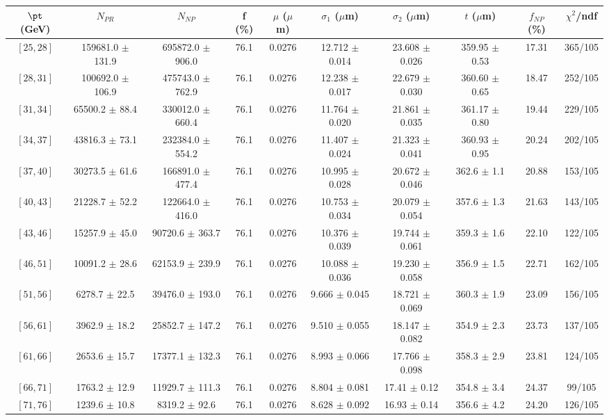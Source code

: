 \begin{tabular}{c||c|c|c|c|c|c|c||c|c}
$\pt$ (GeV) & $N_{PR}$ & $N_{NP}$ & f (\%) & $\mu$ ($\mu$m) & $\sigma_1$ ($\mu$m) & $\sigma_2$ ($\mu$m)  & $t$ ($\mu$m) & $f_{NP}$ (\%) & $\chi^2$/ndf \\
\hline
$[25, 28]$ & 159681.0 $\pm$ 131.9 & 695872.0 $\pm$ 906.0 & 76.1 & 0.0276 & 12.712 $\pm$ 0.014 & 23.608 $\pm$ 0.026 & 359.95 $\pm$ 0.53 & 17.31 & 365/105\\
$[28, 31]$ & 100692.0 $\pm$ 106.9 & 475743.0 $\pm$ 762.9 & 76.1 & 0.0276 & 12.238 $\pm$ 0.017 & 22.679 $\pm$ 0.030 & 360.60 $\pm$ 0.65 & 18.47 & 252/105\\
$[31, 34]$ & 65500.2 $\pm$ 88.4 & 330012.0 $\pm$ 660.4 & 76.1 & 0.0276 & 11.764 $\pm$ 0.020 & 21.861 $\pm$ 0.035 & 361.17 $\pm$ 0.80 & 19.44 & 229/105\\
$[34, 37]$ & 43816.3 $\pm$ 73.1 & 232384.0 $\pm$ 554.2 & 76.1 & 0.0276 & 11.407 $\pm$ 0.024 & 21.323 $\pm$ 0.041 & 360.93 $\pm$ 0.95 & 20.24 & 202/105\\
$[37, 40]$ & 30273.5 $\pm$ 61.6 & 166891.0 $\pm$ 477.4 & 76.1 & 0.0276 & 10.995 $\pm$ 0.028 & 20.672 $\pm$ 0.046 & 362.6 $\pm$ 1.1 & 20.88 & 153/105\\
$[40, 43]$ & 21228.7 $\pm$ 52.2 & 122664.0 $\pm$ 416.0 & 76.1 & 0.0276 & 10.753 $\pm$ 0.034 & 20.079 $\pm$ 0.054 & 357.6 $\pm$ 1.3 & 21.63 & 143/105\\
$[43, 46]$ & 15257.9 $\pm$ 45.0 & 90720.6 $\pm$ 363.7 & 76.1 & 0.0276 & 10.376 $\pm$ 0.039 & 19.744 $\pm$ 0.061 & 359.3 $\pm$ 1.6 & 22.10 & 122/105\\
$[46, 51]$ & 10091.2 $\pm$ 28.6 & 62153.9 $\pm$ 239.9 & 76.1 & 0.0276 & 10.088 $\pm$ 0.036 & 19.230 $\pm$ 0.058 & 356.9 $\pm$ 1.5 & 22.71 & 162/105\\
$[51, 56]$ & 6278.7 $\pm$ 22.5 & 39476.0 $\pm$ 193.0 & 76.1 & 0.0276 & 9.666 $\pm$ 0.045 & 18.721 $\pm$ 0.069 & 360.3 $\pm$ 1.9 & 23.09 & 156/105\\
$[56, 61]$ & 3962.9 $\pm$ 18.2 & 25852.7 $\pm$ 147.2 & 76.1 & 0.0276 & 9.510 $\pm$ 0.055 & 18.147 $\pm$ 0.082 & 354.9 $\pm$ 2.3 & 23.73 & 137/105\\
$[61, 66]$ & 2653.6 $\pm$ 15.7 & 17377.1 $\pm$ 132.3 & 76.1 & 0.0276 & 8.993 $\pm$ 0.066 & 17.766 $\pm$ 0.098 & 358.3 $\pm$ 2.9 & 23.81 & 124/105\\
$[66, 71]$ & 1763.2 $\pm$ 12.9 & 11929.7 $\pm$ 111.3 & 76.1 & 0.0276 & 8.804 $\pm$ 0.081 & 17.41 $\pm$ 0.12 & 354.8 $\pm$ 3.4 & 24.37 & 99/105\\
$[71, 76]$ & 1239.6 $\pm$ 10.8 & 8319.2 $\pm$ 92.6 & 76.1 & 0.0276 & 8.628 $\pm$ 0.092 & 16.93 $\pm$ 0.14 & 356.6 $\pm$ 4.2 & 24.20 & 126/105\\

\end{tabular}
